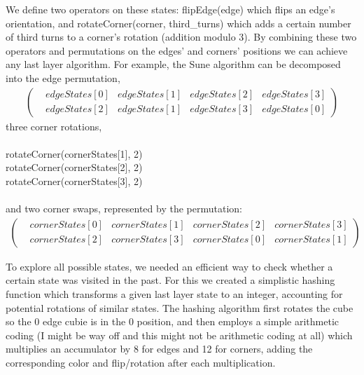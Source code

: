 \documentclass{article}
\begin{document}
            We define two operators on these states: flipEdge(edge)
            which flips an edge's orientation, and rotateCorner(corner,
            third\_turns) which adds a certain number of third turns to a
            corner's rotation (addition modulo 3).
            By combining these two operators and permutations on the edges' and
            corners' positions we can achieve any last layer algorithm. For
            example, the Sune algorithm can be decomposed into the edge
            permutation,
            \begin{align}
            \begin{pmatrix}
            &edgeStates[0] &edgeStates[1] &edgeStates[2] &edgeStates[3] \\
            &edgeStates[2] &edgeStates[1] &edgeStates[3] &edgeStates[0]
            \end{pmatrix} \nonumber
            \end{align}
            three corner rotations,\\\\
            rotateCorner(cornerStates[1], 2)\\
            rotateCorner(cornerStates[2], 2)\\
            rotateCorner(cornerStates[3], 2)\\\\
            and two corner swaps, represented by the permutation:
            \begin{align}
            \begin{pmatrix}
            &cornerStates[0] &cornerStates[1] &cornerStates[2] &cornerStates[3] \\
            &cornerStates[2] &cornerStates[3] &cornerStates[0] &cornerStates[1]
            \end{pmatrix} \nonumber
            \end{align}

            To explore all possible states, we needed an efficient way to check
            whether a certain state was visited in the past. For this we created
            a simplistic hashing function which transforms a given last layer
            state to an integer, accounting for potential rotations of similar
            states. The hashing algorithm first rotates the cube so the 0 edge
            cubie is in the 0 position, and then employs a simple arithmetic
            coding (I might be way off and this might not be arithmetic coding
            at all) which multiplies an accumulator by 8 for edges and 12 for
            corners, adding the corresponding color and flip/rotation after each
            multiplication.
\end{document}
